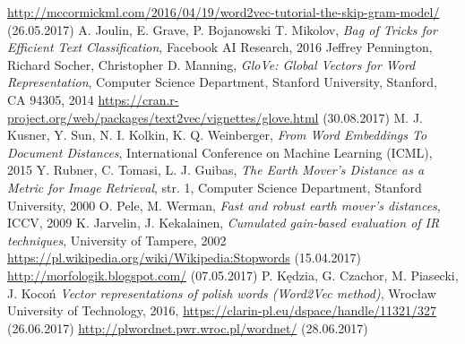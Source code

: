 \documentclass[pl]{minipw} %
\begin{document}
\begin{thebibliography}{30}
	\url{http://mccormickml.com/2016/04/19/word2vec-tutorial-the-skip-gram-model/}
	(26.05.2017)
	A. Joulin, E. Grave, P. Bojanowski T. Mikolov,
	\emph{Bag of Tricks for Efficient Text Classification},
	Facebook AI Research,
	2016
	Jeffrey Pennington, Richard Socher, Christopher D. Manning,
	\emph{GloVe: Global Vectors for Word Representation},
	Computer Science Department, Stanford University, Stanford, CA 94305,
	2014
	\url{https://cran.r-project.org/web/packages/text2vec/vignettes/glove.html}
	(30.08.2017)
	M. J. Kusner, Y. Sun, N. I. Kolkin, K. Q. Weinberger,
	\emph{From Word Embeddings To Document Distances},
	International Conference on Machine Learning (ICML),
	2015	
	Y. Rubner, C. Tomasi, L. J. Guibas,
	\emph{The Earth Mover's Distance as a Metric for Image Retrieval},
	str. 1,
	Computer Science Department, Stanford University,
	2000	
	O. Pele, M. Werman,
	\emph{Fast and robust earth mover's distances},
	ICCV,
	2009
	K. Jarvelin, J. Kekalainen,
	\emph{Cumulated gain-based evaluation of IR techniques},
	University of Tampere,
	2002
	\url{https://pl.wikipedia.org/wiki/Wikipedia:Stopwords}
	(15.04.2017)
	\url{http://morfologik.blogspot.com/}
	(07.05.2017)
	P. Kędzia, G. Czachor, M. Piasecki, J. Kocoń
	\emph{Vector representations of polish words (Word2Vec method)},
	Wrocław University of Technology,
	2016,
	\url{https://clarin-pl.eu/dspace/handle/11321/327}
	(26.06.2017)
	\url{http://plwordnet.pwr.wroc.pl/wordnet/}
	(28.06.2017)
	
\end{thebibliography}






\listoffigures


\renewcommand{\listtablename}{Spis tabel}
\listoftables
\end{document}
